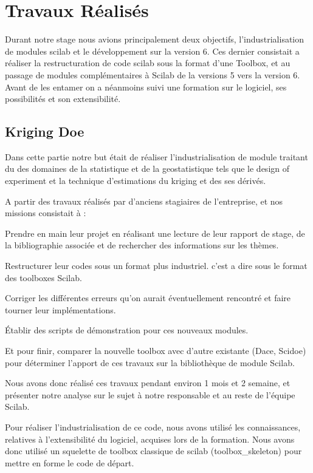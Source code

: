 \section*{Travaux Réalisés}

Durant notre stage nous avions principalement deux objectifs,
l’industrialisation de modules scilab et le développement sur
la version 6.
Ces dernier consistait a réaliser la restructuration de code scilab sous
la format d’une Toolbox, et au passage de modules complémentaires
à Scilab de la versions 5 vers la version 6.
Avant de les entamer on a néanmoins suivi une formation sur le logiciel,
ses possibilités et son extensibilité.

\subsection*{Kriging Doe}

Dans cette partie notre but était de réaliser l’industrialisation de module
traitant du des domaines de la statistique et de la geostatistique tels que
le design of experiment et la technique d’estimations du kriging et des ses dérivés.

A partir des travaux réalisés par d’anciens stagiaires de l’entreprise,
et nos missions consistait à :

Prendre en main leur projet en réalisant une lecture de leur rapport de stage,
de la bibliographie associée et de rechercher des informations sur les thèmes.

Restructurer leur codes sous un format plus industriel.
c’est a dire sous le format des toolboxes Scilab.

Corriger les différentes erreurs qu’on aurait éventuellement rencontré
et faire tourner leur implémentations.

Établir des scripts de démonstration pour ces nouveaux modules.

Et pour finir, comparer la nouvelle toolbox avec d’autre existante (Dace, Scidoe)
pour déterminer l’apport de ces travaux sur la bibliothèque de module Scilab.

Nous avons donc réalisé ces travaux pendant environ 1 mois et 2 semaine,
et présenter notre analyse sur le sujet à notre responsable et au reste de l’équipe Scilab.

Pour réaliser l’industrialisation de ce code, nous avons utilisé les connaissances,
relatives à l’extensibilité du logiciel, acquises lors de la formation.
Nous avons donc utilisé un squelette de toolbox classique de scilab (toolbox\_skeleton)
pour mettre en forme le code de départ.


